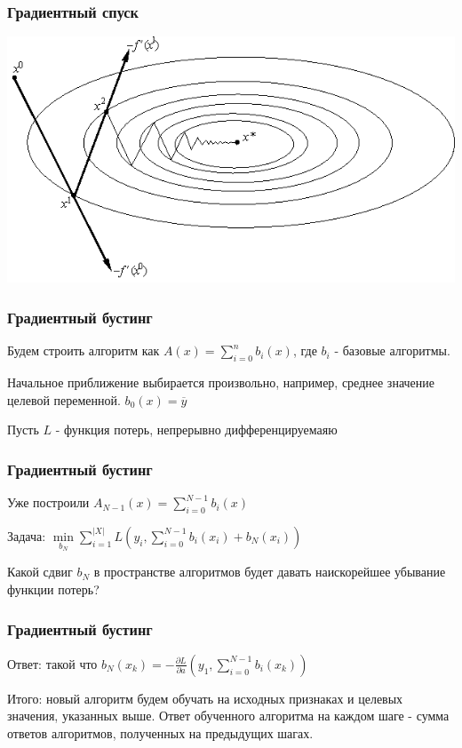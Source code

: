 \documentclass[14pt]{beamer}
\begin{document}
\begin{frame}
\frametitle{Градиентный спуск}
    \begin{center}
        \includegraphics[width=\textheight]{tree_gradient_descent.png}
    \end{center}

\end{frame}

\begin{frame}
\frametitle{Градиентный бустинг}
    Будем строить алгоритм как $A(x) = \sum\limits_{i=0}^{n} b_i(x)$, где $b_i$ - базовые алгоритмы.
    
    Начальное приближение выбирается произвольно, например, среднее значение целевой переменной.
    $b_0(x) = \overline{y}$
    
    Пусть $L$ - функция потерь, непрерывно дифференцируемаяю

    
\end{frame}

\begin{frame}
\frametitle{Градиентный бустинг}
    Уже построили $A_{N-1}(x) = \sum\limits_{i=0}^{N - 1} b_i(x)$
    
    Задача: $\min\limits_{b_N} \sum\limits_{i=1}^{|X|} L(y_i, \sum_{i=0}^{N-1} b_i(x_i) + b_N(x_i)) $
    
    Какой сдвиг $b_N$ в пространстве алгоритмов будет давать наискорейшее убывание функции потерь?
\end{frame}


\begin{frame}
\frametitle{Градиентный бустинг}
    Ответ: такой что $b_N(x_k) = -\frac{\partial L}{\partial a}(y_1, \sum_{i=0}^{N-1} b_i(x_k))$
    
    Итого: новый алгоритм будем обучать на исходных признаках и целевых значения, указанных выше.
    Ответ обученного алгоритма на каждом шаге - сумма ответов алгоритмов, полученных на предыдущих шагах.
    
    
\end{frame}
\end{document}
